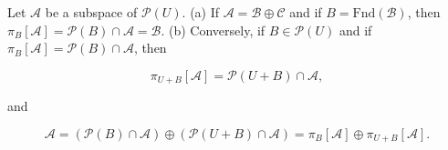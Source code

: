 Let $\mathcal{A}$ be a subspace of $\mathcal{P}(U)$.
(a) If $\mathcal{A} = \mathcal{B} \oplus \mathcal{C}$ and if $B = \text{Fnd}(\mathcal{B})$, then $\pi_B[\mathcal{A}] = \mathcal{P}(B) \cap \mathcal{A} = \mathcal{B}$.
(b) Conversely, if $B \in \mathcal{P}(U)$ and if $\pi_B[\mathcal{A}] = \mathcal{P}(B) \cap \mathcal{A}$, then

$$\pi_{U+B}[\mathcal{A}] = \mathcal{P}(U + B) \cap \mathcal{A},$$

and

$$\mathcal{A} = (\mathcal{P}(B) \cap \mathcal{A}) \oplus (\mathcal{P}(U + B) \cap \mathcal{A}) = \pi_B[\mathcal{A}] \oplus \pi_{U+B}[\mathcal{A}].$$
